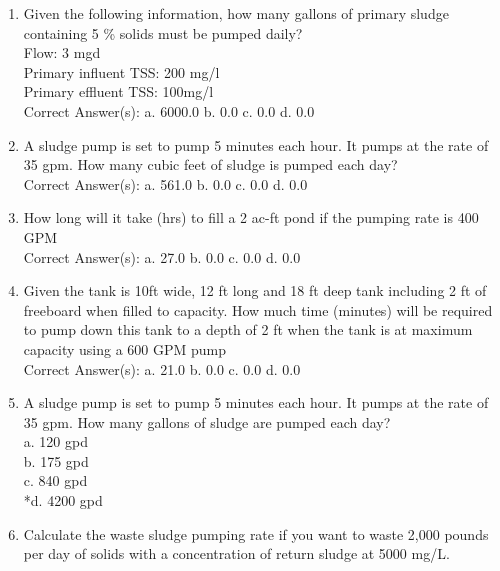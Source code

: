 \documentclass{article}
\begin{document}
\begin{enumerate}
\item  Given the following information, how many gallons of primary sludge containing 5 \% solids must be pumped daily?\\
Flow:  3 mgd\\
Primary influent TSS:  200 mg/l\\
Primary effluent TSS: 100mg/l\\

Correct Answer(s):
a. 6000.0
b. 0.0
c. 0.0
d. 0.0 \\

\item  A sludge pump is set to pump 5 minutes each hour.  It pumps at the rate of 35 gpm.  How many cubic feet of sludge is pumped each day? \\

Correct Answer(s):
a. 561.0
b. 0.0
c. 0.0
d. 0.0 \\

\item  How long will it take (hrs) to fill a 2 ac-ft pond if the pumping rate is 400 GPM \\

Correct Answer(s):
a. 27.0
b. 0.0
c. 0.0
d. 0.0 \\

\item  Given the tank is 10ft wide, 12 ft long and 18 ft deep tank including 2 ft of freeboard when filled to capacity.  How much time (minutes) will be required to pump down this tank to a depth of 2 ft when the tank is at maximum capacity using a 600 GPM pump  \\

Correct Answer(s):
a. 21.0
b. 0.0
c. 0.0
d. 0.0 \\

\item  A sludge pump is set to pump 5 minutes each hour. It pumps at the rate of 35 gpm. How many gallons of sludge are pumped each day? \\

a. 120 gpd \\
b. 175 gpd \\
c. 840 gpd \\
*d. 4200 gpd \\

\item  Calculate the waste sludge pumping rate if you want to waste 2,000 pounds per day of solids with a concentration of return sludge at 5000 mg/L. \\


\end{enumerate}
\end{document}
